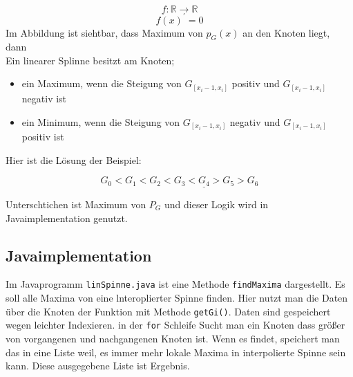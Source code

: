  $$f: \mathbb{R} \to \mathbb{R}$$
\begin{equation} 
f(x)^{\prime} = 0
\end{equation}
Im Abbildung ist siehtbar, dass Maximum von $p_G(x)$ an den Knoten liegt, dann\\
Ein linearer Splinne besitzt am Knoten;
\begin{itemize}
\item ein Maximum, wenn die Steigung von $G_{[x_i -1, x_i]}$ positiv und $G_{[x_i -1, x_i]}$ negativ ist

\item ein Minimum, wenn die Steigung von $G_{[x_i -1, x_i]}$ negativ und $G_{[x_i -1, x_i]}$ positiv ist
\end{itemize}

Hier ist die Lösung der Beispiel:

$$G_0 < G_1 <G_2 <G_3 <\underline{G_4}> G_5 > G_6$$

Unterschtichen ist Maximum von $P_G$ und dieser Logik wird in Javaimplementation genutzt.  
\subsection{Javaimplementation}
Im Javaprogramm  \verb|linSpinne.java| ist eine Methode \verb|findMaxima|  dargestellt.
Es soll  alle Maxima von eine lnteroplierter Spinne finden. Hier nutzt man die Daten über die Knoten der Funktion mit Methode \verb|getGi()|.
Daten sind gespeichert wegen leichter Indexieren. in der \verb|for| Schleife Sucht man ein Knoten dass größer von vorgangenen und nachgangenen Knoten ist. Wenn es findet, speichert man das in eine Liste weil, es immer mehr lokale Maxima in interpolierte Spinne sein kann. Diese ausgegebene Liste ist Ergebnis.

